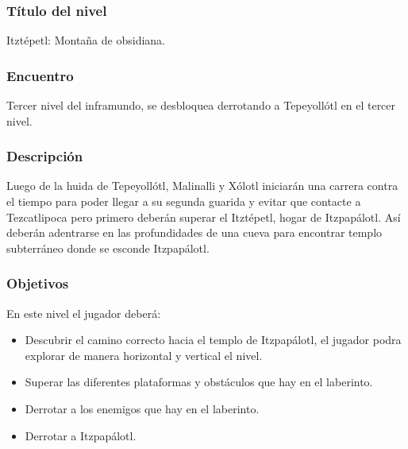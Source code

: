 \documentclass[11pt,letterpaper]{article}
\begin{document}
        \subsubsection{Título del nivel}
        Itztépetl: Montaña de obsidiana.
        \subsubsection{Encuentro}
Tercer nivel del inframundo, se desbloquea derrotando a Tepeyollótl en el tercer nivel.
        \subsubsection{Descripción}
        Luego de la huida de Tepeyollótl, Malinalli y Xólotl iniciarán una carrera contra el tiempo para poder llegar a su segunda guarida y evitar que contacte a Tezcatlipoca pero primero deberán superar el Itztépetl, hogar de Itzpapálotl. Así deberán adentrarse en las profundidades de una cueva para encontrar templo subterráneo donde se esconde Itzpapálotl. 
        \subsubsection{Objetivos}
En este nivel el jugador deberá:        
\begin{itemize}
        \item Descubrir el camino correcto hacia el templo de Itzpapálotl, el jugador podra explorar de manera horizontal y vertical el nivel.
        \item Superar las diferentes plataformas y obstáculos que hay en el laberinto. 
        \item Derrotar a los enemigos que hay en el laberinto.
        \item Derrotar a Itzpapálotl.
\end{itemize}
\end{document}
